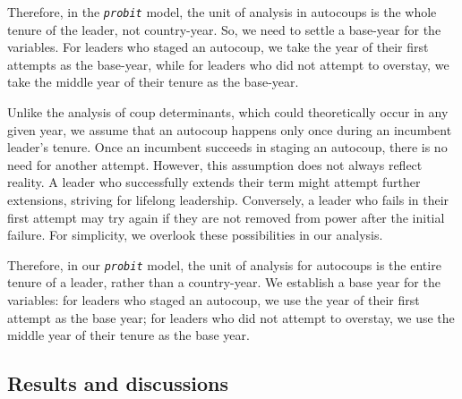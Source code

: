 \documentclass[
  12pt,
]{report}
\begin{document}
Therefore, in the \emph{\texttt{probit}} model, the unit of analysis in
autocoups is the whole tenure of the leader, not country-year. So, we
need to settle a base-year for the variables. For leaders who staged an
autocoup, we take the year of their first attempts as the base-year,
while for leaders who did not attempt to overstay, we take the middle
year of their tenure as the base-year.

Unlike the analysis of coup determinants, which could theoretically
occur in any given year, we assume that an autocoup happens only once
during an incumbent leader's tenure. Once an incumbent succeeds in
staging an autocoup, there is no need for another attempt. However, this
assumption does not always reflect reality. A leader who successfully
extends their term might attempt further extensions, striving for
lifelong leadership. Conversely, a leader who fails in their first
attempt may try again if they are not removed from power after the
initial failure. For simplicity, we overlook these possibilities in our
analysis.

Therefore, in our \emph{\texttt{probit}} model, the unit of analysis for
autocoups is the entire tenure of a leader, rather than a country-year.
We establish a base year for the variables: for leaders who staged an
autocoup, we use the year of their first attempt as the base year; for
leaders who did not attempt to overstay, we use the middle year of their
tenure as the base year.

\subsection{Results and discussions}\label{results-and-discussions}
\end{document}
